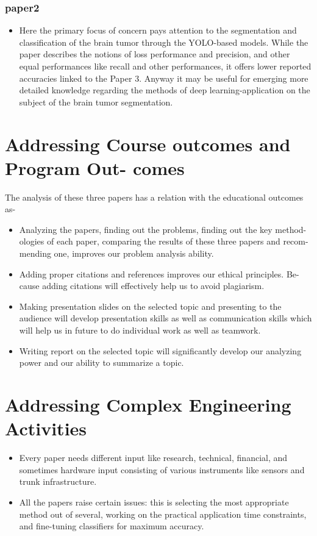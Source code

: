 \documentclass[a4paper,12pt]{extarticle}
\begin{document}
\subsubsection{paper2}
\begin{itemize}
    \item Here the primary focus of concern pays attention to the segmentation and classification of the brain tumor\cite{pereira2016brain} through the YOLO-based models. While the paper describes the notions of loss performance and precision, and other equal performances like recall and other performances, it offers lower reported accuracies\cite{isensee2021nnU} linked to the Paper 3. Anyway it may be useful for emerging more detailed knowledge regarding the methods of deep learning-application on the subject of the brain tumor segmentation.
\end{itemize}


\newpage
\section{Addressing Course outcomes and Program Out-
comes}
The analysis of these three papers has a relation with the educational outcomes as-
\begin{itemize}
    \item  Analyzing the papers, finding out the problems, finding out the key method-ologies of each paper, comparing the results of these three papers and recom-mending one, improves our problem analysis ability.

    \item  Adding proper citations and references improves our ethical principles. Be-cause adding citations will effectively help us to avoid plagiarism.
    \item Making presentation slides on the selected topic and presenting to the audience will develop presentation skills as well as communication skills which will help us in future to do individual work as well as teamwork.
\item  Writing report on the selected topic will significantly develop our analyzing power and our ability to summarize a topic.

\end{itemize}

\section{Addressing Complex Engineering Activities}
\begin{itemize}
    \item Every paper needs different input like research, technical, financial, and sometimes hardware input consisting of various instruments like sensors and trunk infrastructure.

\item All the papers raise certain issues: this is selecting the most appropriate method out of several, working on the practical application time constraints, and fine-tuning classifiers for maximum accuracy.






\end{itemize}
\end{document}
